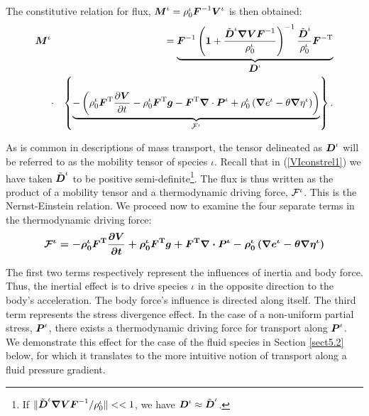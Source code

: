 \noindent The constitutive relation for flux, $\mbox{\boldmath$ M$}^\iota =
\rho^\iota_0\mbox{\boldmath$ F$}^{-1}\mbox{\boldmath$ V$}^\iota$ is then obtained:
\begin{eqnarray}
\mbox{\boldmath$ M$}^\iota & &=\underbrace{\mbox{\boldmath$ F$}^{-1}\left({\bf 1} +
\frac{\tilde{\mbox{\boldmath$ D$}}^\iota\mbox{\boldmath$\nabla$}\mbox{\boldmath$ V$}\mbox{\boldmath$ F$}^{-1}}{\rho^\iota_0}\right)^{-1}\frac{\tilde{\mbox{\boldmath$ D$}}^\iota}{\rho^\iota_0}\mbox{\boldmath$ F$}^{-\mathrm{T}}}_{\mbox{\boldmath$ D$}^\iota}\nonumber\\
&\cdot&\left\{\underbrace{-\left(\rho^\iota_0\mbox{\boldmath$ F$}^\mathrm{T}\frac{\partial\mbox{\boldmath$ V$}}{\partial
t} - \rho_0^\iota\mbox{\boldmath$ F$}^\mathrm{T}\mbox{\boldmath$ g$} -
\mbox{\boldmath$ F$}^\mathrm{T}\mbox{\boldmath$\nabla$}\cdot\mbox{\boldmath$ P$}^\iota + \rho^\iota_0\left(\mbox{\boldmath$\nabla$}
e^\iota -
\theta\mbox{\boldmath$\nabla$}\eta^\iota\right)\right)}_{\boldmath{{\mathcal F}}^\iota}\right\}.
\label{MIconstrel}
\end{eqnarray}

As is common in descriptions of mass transport, the tensor
delineated as $\mbox{\boldmath$ D$}^\iota$ will be referred to as the mobility
tensor of species $\iota$. Recall that in (\ref{VIconstrel1}) we
have taken $\tilde{\mbox{\boldmath$ D$}}^\iota$ to be positive
semi-definite\footnote{If
$\Vert\tilde{\mbox{\boldmath$ D$}}^\iota\mbox{\boldmath$\nabla$}\mbox{\boldmath$ V$}\mbox{\boldmath$ F$}^{-1}/\rho^\iota_0\Vert << 1$,
we have $\mbox{\boldmath$ D$}^\iota \approx \tilde{\mbox{\boldmath$ D$}}^\iota$.}. The flux is thus
written as the product of a mobility tensor and a thermodynamic
driving force, $\boldmath{{\mathcal F}}^\iota$. This is the Nernst-Einstein
relation. We proceed now to examine the four separate terms in the
thermodynamic driving force:
\begin{equation}
\boldmath{{\mathcal F}}^\iota =
-\rho^\iota_0\mbox{\boldmath$ F$}^\mathrm{T}\frac{\partial\mbox{\boldmath$ V$}}{\partial t} +
\rho_0^\iota\mbox{\boldmath$ F$}^\mathrm{T}\mbox{\boldmath$ g$} +
\mbox{\boldmath$ F$}^\mathrm{T}\mbox{\boldmath$\nabla$}\cdot\mbox{\boldmath$ P$}^\iota - \rho^\iota_0\left(\mbox{\boldmath$\nabla$}
e^\iota - \theta\mbox{\boldmath$\nabla$}\eta^\iota\right) \label{drivingforceI}
\end{equation}

\noindent The first two terms respectively represent the
influences of inertia and body force. Thus, the inertial effect is
to drive species $\iota$ in the opposite direction to the body's
acceleration. The body force's influence is directed along itself.
The third term represents the stress divergence effect. In the
case of a non-uniform partial stress, $\mbox{\boldmath$ P$}^\iota$, there exists a
thermodynamic driving force for transport along $\mbox{\boldmath$ P$}^\iota$. We
demonstrate this effect for the case of the fluid species in
Section \ref{sect5.2} below, for which it translates to the more
intuitive notion of transport along a fluid pressure gradient.

